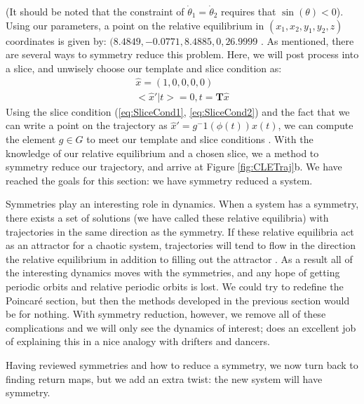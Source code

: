 \documentclass[12 pt]{article}
\begin{document}
(It should be noted that the constraint of $\dot \theta_1 = \dot \theta_2$ requires that $\sin(\theta) < 0$).  Using our parameters, a point on the relative equilibrium in $(x_1, x_2, y_1, y_2, z)$ coordinates is given by: $(8.4849,-0.0771,8.4885,0,26.9999$  \cite{CB}.
As mentioned, there are several ways to symmetry reduce this problem.  Here, we will post process into a slice, and unwisely choose our template and slice condition as:
\begin{equation}
\begin{split}
\hat{x} = (1, 0, 0, 0 , 0)\\
<\hat{x}'|t> = 0, t = \mathbf{T}\hat{x}
\label{eq:CLEslice}
\end{split}
\end{equation}
Using the slice condition (\ref{eq:SliceCond1}, \ref{eq:SliceCond2}) and the fact that we can write a point on the trajectory as $\hat{x}' = g^-1(\phi(t))x(t)$, we can compute the element $g \in G$ to meet our template and slice conditions \cite{SliceCond}.
With the knowledge of our relative equilibrium and a chosen slice, we a method to symmetry reduce our trajectory, and arrive at Figure \ref{fig:CLETraj}b.  We have reached the goals for this section: we have symmetry reduced a system.

Symmetries play an interesting role in dynamics.  When a system has a symmetry, there exists a set of solutions (we have called these relative equilibria) with trajectories in the same direction as the symmetry.  If these relative equilibria act as an attractor for a chaotic system, trajectories will tend to flow in the direction the relative equilibrium in addition to filling out the attractor \cite{Atl}.  As a result all of the interesting dynamics moves with the symmetries, and any hope of getting periodic orbits and relative periodic orbits is lost.  We could try to redefine the Poincar\'e section, but then the methods developed in the previous section would be for nothing.  With symmetry reduction, however, we remove all of these complications and we will only see the dynamics of interest; \cite{Atl} does an excellent job of explaining this in a nice analogy with drifters and dancers.

Having reviewed symmetries and how to reduce a symmetry, we now turn back to finding return maps, but we add an extra twist: the new system will have symmetry.
\end{document}
